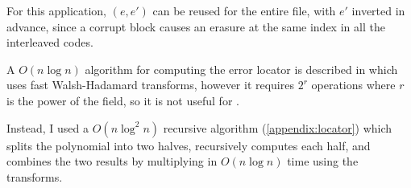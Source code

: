 For this application, $(e, e')$ can be reused for the entire file, with $e'$ inverted in advance, since a corrupt block causes an erasure at the same index in all the interleaved codes.

A $O(n \log n)$ algorithm for computing the error locator is described in \cite{novel-poly} which uses fast Walsh-Hadamard transforms, however it requires $2^r$ operations where $r$ is the power of the field, so it is not useful for .

Instead, I used a $O(n \log^2 n)$ recursive algorithm (\ref{appendix:locator}) which splits the polynomial into two halves, recursively computes each half, and combines the two results by multiplying in $O(n \log n)$ time using the transforms.
\enlargethispage{\baselineskip}
